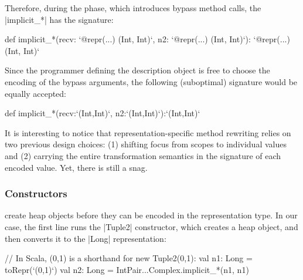 Therefore, during the \coerce{} phase, which introduces bypass method calls, the |implicit_*| has the signature:

\begin{lstlisting-nobreak}
def implicit_*(recv: `@repr(...) (Int, Int)`,  n2: `@repr(...) (Int, Int)`): `@repr(...) (Int, Int)`
\end{lstlisting-nobreak}

Since the programmer defining the description object is free to choose the encoding of the bypass arguments, the following (suboptimal) signature would be equally accepted:

\begin{lstlisting-nobreak}
def implicit_*(recv:`(Int,Int)`, n2:`(Int,Int)`):`(Int,Int)`
\end{lstlisting-nobreak}

It is interesting to notice that representation-specific method rewriting relies on two previous design choices: (1) shifting focus from scopes to individual values and (2) carrying the entire transformation semantics in the signature of each encoded value. %
%
Yet, there is still a snag.

\subsubsection{Constructors} create heap objects before they can be encoded in the representation type. In our case, the first line runs the |Tuple2| constructor, which creates a heap object, and then converts it to the |Long| representation:

\begin{lstlisting-nobreak}
// In Scala, (0,1) is a shorthand for new Tuple2(0,1):
val n1: Long = toRepr(`(0,1)`)
val n2: Long = IntPair...Complex.implicit_*(n1, n1)
\end{lstlisting-nobreak}

